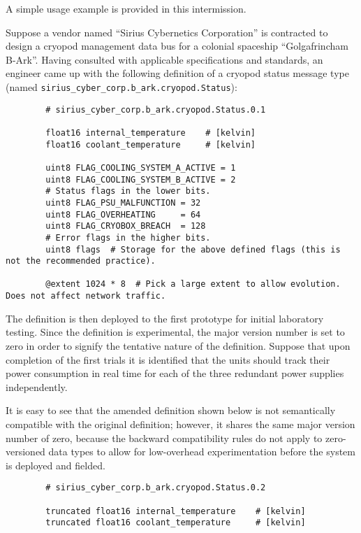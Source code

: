 \begin{remark}[breakable]
    A simple usage example is provided in this intermission.

    Suppose a vendor named ``Sirius Cybernetics Corporation'' is contracted to design a
    cryopod management data bus for a colonial spaceship ``Golgafrincham B-Ark''.
    Having consulted with applicable specifications and standards, an engineer came up with the following
    definition of a cryopod status message type (named \verb|sirius_cyber_corp.b_ark.cryopod.Status|):

    \begin{verbatim}
        # sirius_cyber_corp.b_ark.cryopod.Status.0.1

        float16 internal_temperature    # [kelvin]
        float16 coolant_temperature     # [kelvin]

        uint8 FLAG_COOLING_SYSTEM_A_ACTIVE = 1
        uint8 FLAG_COOLING_SYSTEM_B_ACTIVE = 2
        # Status flags in the lower bits.
        uint8 FLAG_PSU_MALFUNCTION = 32
        uint8 FLAG_OVERHEATING     = 64
        uint8 FLAG_CRYOBOX_BREACH  = 128
        # Error flags in the higher bits.
        uint8 flags  # Storage for the above defined flags (this is not the recommended practice).

        @extent 1024 * 8  # Pick a large extent to allow evolution. Does not affect network traffic.
    \end{verbatim}

    The definition is then deployed to the first prototype for initial laboratory testing.
    Since the definition is experimental, the major version number is set to zero in order to signify the
    tentative nature of the definition.
    Suppose that upon completion of the first trials it is identified that the units should track their
    power consumption in real time for each of the three redundant power supplies independently.

    It is easy to see that the amended definition shown below is not semantically compatible
    with the original definition; however, it shares the same major version number of zero, because the backward
    compatibility rules do not apply to zero-versioned data types to allow for low-overhead experimentation
    before the system is deployed and fielded.

    \begin{verbatim}
        # sirius_cyber_corp.b_ark.cryopod.Status.0.2

        truncated float16 internal_temperature    # [kelvin]
        truncated float16 coolant_temperature     # [kelvin]


\end{verbatim}
\end{remark}
